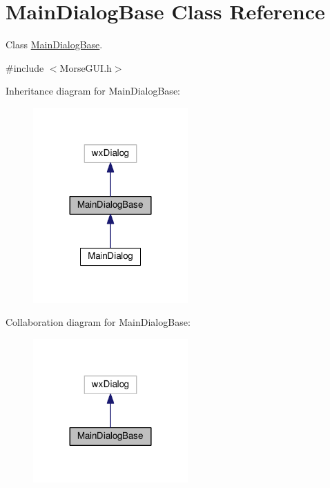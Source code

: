 \hypertarget{classMainDialogBase}{}\section{Main\+Dialog\+Base Class Reference}
\label{classMainDialogBase}


Class \hyperlink{classMainDialogBase}{Main\+Dialog\+Base}.  




{\ttfamily \#include $<$Morse\+G\+U\+I.\+h$>$}



Inheritance diagram for Main\+Dialog\+Base\+:
\nopagebreak
\begin{figure}[H]
\begin{center}
\leavevmode
\includegraphics[width=168pt]{classMainDialogBase__inherit__graph}
\end{center}
\end{figure}


Collaboration diagram for Main\+Dialog\+Base\+:
\nopagebreak
\begin{figure}[H]
\begin{center}
\leavevmode
\includegraphics[width=168pt]{classMainDialogBase__coll__graph}
\end{center}
\end{figure}
